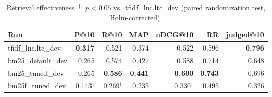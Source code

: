 \begin{table}[t]
\centering
\begin{tabular}{lrrrrrr}
\toprule
Run & P@10 & R@10 & MAP & nDCG@10 & RR & judged@10 \\
\midrule
tfidf\_lnc.ltc\_dev & \textbf{0.317} & 0.521 & 0.374 & 0.522 & 0.596 & \textbf{0.796} \\
bm25\_default\_dev & 0.265 & 0.574 & 0.427 & 0.588 & 0.714 & 0.648 \\
bm25\_tuned\_dev & 0.265 & \textbf{0.586} & \textbf{0.441} & \textbf{0.600} & \textbf{0.743} & 0.696 \\
bm25f\_tuned\_dev & 0.143$^\dagger$ & 0.269$^\dagger$ & 0.235 & 0.330$^\dagger$ & 0.495 & 0.326 \\
\bottomrule
\end{tabular}
\caption{Retrieval effectiveness. $^\dagger$: $p<0.05$ vs.\ tfidf\_lnc.ltc\_dev (paired randomization test, Holm-corrected).}
\end{table}
